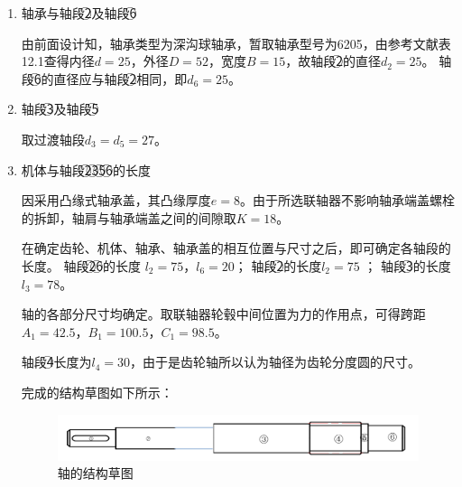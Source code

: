 \begin{enumerate}[i]
	\item 轴承与轴段\textcircled{2}及轴段\textcircled{6}
	\par 由前面设计知，轴承类型为深沟球轴承，暂取轴承型号为6205，由参考文献\cite{1}表12.1查得内径$d=25$，外径$D=52$，宽度$B=15$，故轴段\textcircled{2}的直径$d_2=25$。
	轴段\textcircled{6}的直径应与轴段\textcircled{2}相同，即$d_6=25$。
	
	\item 轴段\textcircled{3}及轴段\textcircled{5}
	\par 取过渡轴段$d_3=d_5=27$。
	
	\item 机体与轴段\textcircled{2}\textcircled{3}\textcircled{5}\textcircled{6}的长度
	\par 因采用凸缘式轴承盖，其凸缘厚度$e=8$。由于所选联轴器不影响轴承端盖螺栓的拆卸，轴肩与轴承端盖之间的间隙取$K=18$。
	\par 在确定齿轮、机体、轴承、轴承盖的相互位置与尺寸之后，即可确定各轴段的长度。
	轴段\textcircled{2}\textcircled{6}的长度 $l_2=75$，$l_6=20$；
	轴段\textcircled{2}的长度$l_2=75$ ；
	轴段\textcircled{3}的长度 $l_3=78$。
	\par 轴的各部分尺寸均确定。取联轴器轮毂中间位置为力的作用点，可得跨距$A_1=42.5$，$B_1=100.5$，$C_1=98.5$。 
	\par 轴段\textcircled{4}长度为$l_4=30$，由于是齿轮轴所以认为轴径为齿轮分度圆的尺寸。
	\par 完成的结构草图如下所示：
	\begin{figure}[H]
		\begin{center}
			\caption{轴\uppercase\expandafter{}的结构草图}
			\includegraphics[width=\textwidth]{pic/zhou1.png}
		\end{center}
	\end{figure}
\end{enumerate}
